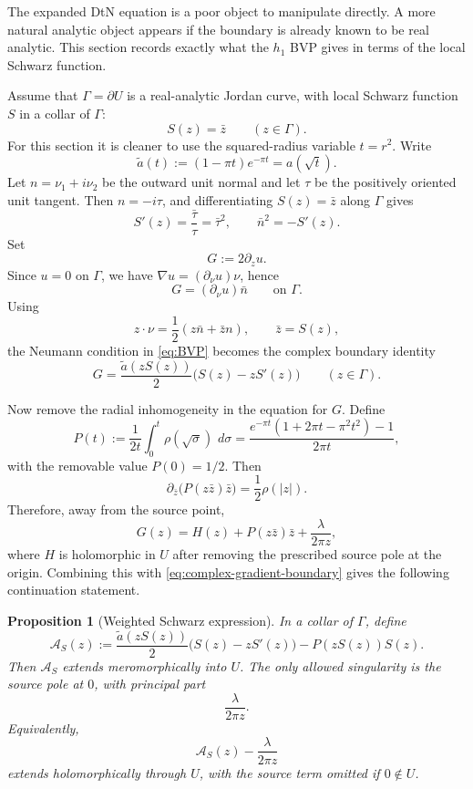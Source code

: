 \documentclass[11pt]{article}
\newtheorem{proposition}[theorem]{Proposition}
\newcommand{\dd}{\,d}
\newcommand{\1}{\mathbf 1}
\begin{document}
The expanded DtN equation is a poor object to manipulate directly.  A more natural
analytic object appears if the boundary is already known to be real analytic.  This
section records exactly what the \(h_1\) BVP gives in terms of the local Schwarz
function.

Assume that \(\Gamma=\partial U\) is a real-analytic Jordan curve, with local Schwarz
function \(S\) in a collar of \(\Gamma\):
\[
  S(z)=\bar z
  \qquad (z\in\Gamma).
\]
For this section it is cleaner to use the squared-radius variable \(t=r^2\).  Write
\[
  \widetilde a(t):=(1-\pi t)e^{-\pi t}=a(\sqrt t).
\]
Let \(n=\nu_1+i\nu_2\) be the outward unit normal and let \(\tau\) be the positively
oriented unit tangent.  Then \(n=-i\tau\), and differentiating \(S(z)=\bar z\) along
\(\Gamma\) gives
\[
  S'(z)=\frac{\bar\tau}{\tau}=\bar\tau^2,
  \qquad
  \bar n^2=-S'(z).
\]
Set
\[
  G:=2\partial_z u.
\]
Since \(u=0\) on \(\Gamma\), we have \(\nabla u=(\partial_\nu u)\nu\), hence
\[
  G=(\partial_\nu u)\bar n
  \qquad\text{on }\Gamma.
\]
Using
\[
  z\cdot\nu=\frac12(z\bar n+\bar z n),
  \qquad
  \bar z=S(z),
\]
the Neumann condition in \eqref{eq:BVP} becomes the complex boundary identity
\begin{equation}\label{eq:complex-gradient-boundary}
  G
  =
  \frac{\widetilde a(zS(z))}{2}\bigl(S(z)-zS'(z)\bigr)
  \qquad (z\in\Gamma).
\end{equation}

Now remove the radial inhomogeneity in the equation for \(G\).  Define
\[
  P(t):=\frac{1}{2t}\int_0^t \rho(\sqrt\sigma)\,\dd\sigma
  =
  \frac{e^{-\pi t}(1+2\pi t-\pi^2t^2)-1}{2\pi t},
\]
with the removable value \(P(0)=1/2\).  Then
\[
  \partial_{\bar z}\bigl(P(z\bar z)\bar z\bigr)=\frac12\rho(|z|).
\]
Therefore, away from the source point,
\[
  G(z)=H(z)+P(z\bar z)\bar z+\frac{\lambda}{2\pi z},
\]
where \(H\) is holomorphic in \(U\) after removing the prescribed source pole at
the origin.  Combining this with \eqref{eq:complex-gradient-boundary} gives the
following continuation statement.

\begin{proposition}[Weighted Schwarz expression]\label{prop:weighted-schwarz}
In a collar of \(\Gamma\), define
\begin{equation}\label{eq:weighted-schwarz-expression}
  \mathcal A_S(z)
  :=
  \frac{\widetilde a(zS(z))}{2}\bigl(S(z)-zS'(z)\bigr)
  -
  P(zS(z))S(z).
\end{equation}
Then \(\mathcal A_S\) extends meromorphically into \(U\).  The only allowed
singularity is the source pole at \(0\), with principal part
\[
  \frac{\lambda}{2\pi z}.
\]
Equivalently,
\[
  \mathcal A_S(z)-\frac{\lambda}{2\pi z}
\]
extends holomorphically through \(U\), with the source term omitted if \(0\notin U\).
\end{proposition}
\end{document}

